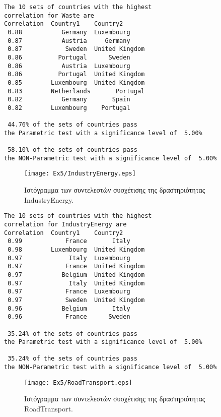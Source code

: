 \documentclass[11pt]{scrartcl} %
\begin{document}
\begin{Verbatim}[fontsize=\small]
The 10 sets of countries with the highest 
correlation for Waste are
Correlation	 Country1	 Country2
 0.88	 	    Germany	 Luxembourg 
 0.87	 	    Austria	    Germany 
 0.87	 	     Sweden	 United Kingdom 
 0.86	 	   Portugal	     Sweden 
 0.86	 	    Austria	 Luxembourg 
 0.86	 	   Portugal	 United Kingdom 
 0.85	 	 Luxembourg	 United Kingdom 
 0.83	 	 Netherlands	   Portugal 
 0.82	 	    Germany	      Spain 
 0.82	 	 Luxembourg	   Portugal 

 44.76% of the sets of countries pass 
the Parametric test with a significance level of  5.00%

 58.10% of the sets of countries pass 
the NON-Parametric test with a significance level of  5.00%
\end{Verbatim}




\begin{figure}[H]

	\centering
	\texttt{[image: Ex5/IndustryEnergy.eps]}	
\caption{Ιστόγραμμα των συντελεστών συσχέτισης της δραστηριότητας IndustryEnergy.}
\label{fig:z53} 
\end{figure}



\begin{Verbatim}[fontsize=\small]
The 10 sets of countries with the highest 
correlation for IndustryEnergy are
Correlation	 Country1	 Country2
 0.99	 	     France	      Italy 
 0.98	 	 Luxembourg	 United Kingdom 
 0.97	 	      Italy	 Luxembourg 
 0.97	 	     France	 United Kingdom 
 0.97	 	    Belgium	 United Kingdom 
 0.97	 	      Italy	 United Kingdom 
 0.97	 	     France	 Luxembourg 
 0.97	 	     Sweden	 United Kingdom 
 0.96	 	    Belgium	      Italy 
 0.96	 	     France	     Sweden 

 35.24% of the sets of countries pass 
the Parametric test with a significance level of  5.00%

 35.24% of the sets of countries pass 
the NON-Parametric test with a significance level of  5.00%
\end{Verbatim}


\begin{figure}[H]

	\centering
	\texttt{[image: Ex5/RoadTransport.eps]}	
\caption{Ιστόγραμμα των συντελεστών συσχέτισης της δραστηριότητας RoadTransport.}
\label{fig:z54} 
\end{figure}
\end{document}
